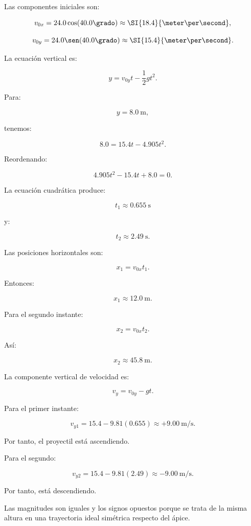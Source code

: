 \begin{explicacion}
Las componentes iniciales son:

\[
v_{0x}
=
24.0\cos(40.0\grado)
\approx
\SI{18.4}{\meter\per\second},
\]

\[
v_{0y}
=
24.0\sen(40.0\grado)
\approx
\SI{15.4}{\meter\per\second}.
\]

La ecuación vertical es:

\[
y
=
v_{0y}t-\frac{1}{2}gt^2.
\]

Para:

\[
y=\SI{8.0}{\meter},
\]

tenemos:

\[
8.0
=
15.4t-4.905t^2.
\]

Reordenando:

\[
4.905t^2-15.4t+8.0=0.
\]

La ecuación cuadrática produce:

\[
\boxed{
t_1\approx\SI{0.655}{\second}
}
\]

y:

\[
\boxed{
t_2\approx\SI{2.49}{\second}
}.
\]

Las posiciones horizontales son:

\[
x_1=v_{0x}t_1.
\]

Entonces:

\[
\boxed{
x_1\approx\SI{12.0}{\meter}
}.
\]

Para el segundo instante:

\[
x_2=v_{0x}t_2.
\]

Así:

\[
\boxed{
x_2\approx\SI{45.8}{\meter}
}.
\]

La componente vertical de velocidad es:

\[
v_y=v_{0y}-gt.
\]

Para el primer instante:

\[
v_{y1}
=
15.4-9.81(0.655)
\approx
+\SI{9.00}{\meter\per\second}.
\]

Por tanto, el proyectil está ascendiendo.

Para el segundo:

\[
v_{y2}
=
15.4-9.81(2.49)
\approx
-\SI{9.00}{\meter\per\second}.
\]

Por tanto, está descendiendo.

Las magnitudes son iguales y los signos opuestos porque se trata de la misma
altura en una trayectoria ideal simétrica respecto del ápice.
\end{explicacion}


